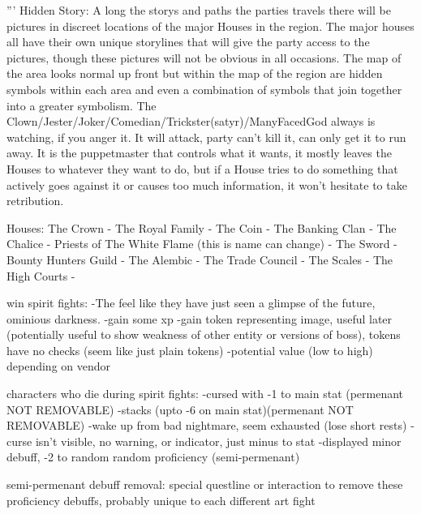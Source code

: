 '''
Hidden Story:
    A long the storys and paths the parties travels there will be pictures in discreet locations of the major Houses in the region.
    The major houses all have their own unique storylines that will give the party access to the pictures, though these pictures will not be obvious in all occasions.
    The map of the area looks normal up front but within the map of the region are hidden symbols within each area and even a combination of symbols that join together into a greater symbolism. The Clown/Jester/Joker/Comedian/Trickster(satyr)/ManyFacedGod always is watching, if you anger it. It will attack, party can't kill it, can only get it to run away. It is the puppetmaster that controls what it wants, it mostly leaves the Houses to whatever they want to do, but if a House tries to do something that actively goes against it or causes too much information, it won't hesitate to take retribution.

Houses:
    The Crown - The Royal Family -
    The Coin - The Banking Clan -
    The Chalice - Priests of The White Flame (this is name can change) -
    The Sword - Bounty Hunters Guild -
    The Alembic - The Trade Council -
    The Scales - The High Courts - 

win spirit fights:
    -The feel like they have just seen a glimpse of the future, ominious darkness.
    -gain some xp
    -gain token representing image, useful later (potentially useful to show weakness of other entity or versions of boss), tokens have no checks (seem like just plain tokens)
    -potential value (low to high) depending on vendor

characters who die during spirit fights:
    -cursed with -1 to main stat (permenant NOT REMOVABLE)
    -stacks (upto -6 on main stat)(permenant NOT REMOVABLE)
    -wake up from bad nightmare, seem exhausted (lose short rests)
    -curse isn't visible, no warning, or indicator, just minus to stat
    -displayed minor debuff, -2 to random random proficiency (semi-permenant)

semi-permenant debuff removal:
    special questline or interaction to remove these proficiency debuffs, probably unique to each different art fight

